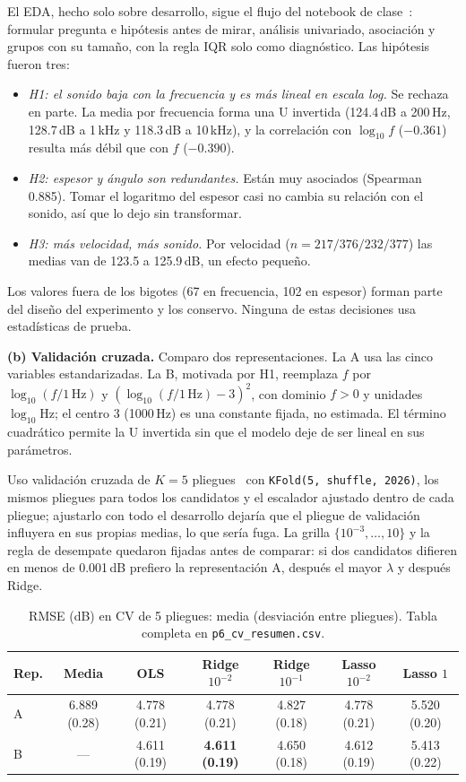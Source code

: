 \documentclass[10pt,a4paper]{article}
\begin{document}
El EDA, hecho solo sobre desarrollo, sigue el flujo del notebook de clase~\cite{nbeda}: formular pregunta e hipótesis antes de mirar, análisis univariado, asociación y grupos con su tamaño, con la regla IQR solo como diagnóstico. Las hipótesis fueron tres:
\begin{itemize}
\item \emph{H1: el sonido baja con la frecuencia y es más lineal en escala log.} Se rechaza en parte. La media por frecuencia forma una U invertida (124.4\,dB a 200\,Hz, 128.7\,dB a 1\,kHz y 118.3\,dB a 10\,kHz), y la correlación con $\log_{10}f$ ($-0.361$) resulta más débil que con $f$ ($-0.390$).
\item \emph{H2: espesor y ángulo son redundantes.} Están muy asociados (Spearman 0.885). Tomar el logaritmo del espesor casi no cambia su relación con el sonido, así que lo dejo sin transformar.
\item \emph{H3: más velocidad, más sonido.} Por velocidad ($n=217/376/232/377$) las medias van de 123.5 a 125.9\,dB, un efecto pequeño.
\end{itemize}
Los valores fuera de los bigotes (67 en frecuencia, 102 en espesor) forman parte del diseño del experimento y los conservo. Ninguna de estas decisiones usa estadísticas de prueba.

\textbf{(b) Validación cruzada.}
Comparo dos representaciones. La A usa las cinco variables estandarizadas. La B, motivada por H1, reemplaza $f$ por $\log_{10}(f/1\,\text{Hz})$ y $(\log_{10}(f/1\,\text{Hz})-3)^2$, con dominio $f>0$ y unidades $\log_{10}$Hz; el centro 3 (1000\,Hz) es una constante fijada, no estimada. El término cuadrático permite la U invertida sin que el modelo deje de ser lineal en sus parámetros.

Uso validación cruzada de $K=5$ pliegues~\cite[secc.~4.5.5]{pml1} con \texttt{KFold(5, shuffle, 2026)}, los mismos pliegues para todos los candidatos y el escalador ajustado dentro de cada pliegue; ajustarlo con todo el desarrollo dejaría que el pliegue de validación influyera en sus propias medias, lo que sería fuga. La grilla $\{10^{-3},\dots,10\}$ y la regla de desempate quedaron fijadas antes de comparar: si dos candidatos difieren en menos de 0.001\,dB prefiero la representación A, después el mayor $\lambda$ y después Ridge.

\begin{table}[h]\centering\small
\caption{RMSE (dB) en CV de 5 pliegues: media (desviación entre pliegues). Tabla completa en \texttt{p6\_cv\_resumen.csv}.}
\begin{tabular}{lcccccc}\toprule
Rep. & Media & OLS & Ridge $10^{-2}$ & Ridge $10^{-1}$ & Lasso $10^{-2}$ & Lasso $1$\\\midrule
A & 6.889 (0.28) & 4.778 (0.21) & 4.778 (0.21) & 4.827 (0.18) & 4.778 (0.21) & 5.520 (0.20)\\
B & --- & 4.611 (0.19) & \textbf{4.611 (0.19)} & 4.650 (0.18) & 4.612 (0.19) & 5.413 (0.22)\\\bottomrule
\end{tabular}\end{table}
\end{document}
